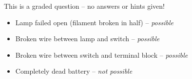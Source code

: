 \vfil 

\eject






This is a graded question -- no answers or hints given!







\begin{itemize}
\item{} Lamp failed open (filament broken in half) -- {\it possible}
\item{} Broken wire between lamp and switch -- {\it possible}
\item{} Broken wire between switch and terminal block -- {\it possible}
\item{} Completely dead battery -- {\it not possible}
\end{itemize}




